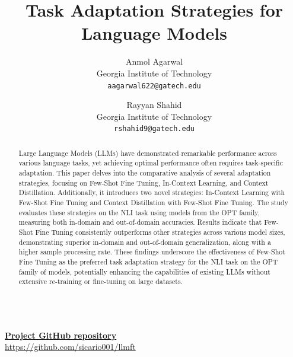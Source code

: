 \documentclass[10pt,twocolumn,letterpaper]{article}
\begin{document}
\title{Task Adaptation Strategies for Language Models}

\author{Anmol Agarwal\\
	Georgia Institute of Technology\\
	{\tt\small aagarwal622@gatech.edu}
	\and
	Rayyan Shahid\\
	Georgia Institute of Technology\\
	{\tt\small rshahid9@gatech.edu}
}

\maketitle




\begin{abstract}
	Large Language Models (LLMs) have demonstrated remarkable performance across various language tasks, yet achieving optimal performance often requires task-specific adaptation. This paper delves into the comparative analysis of several adaptation strategies, focusing on Few-Shot Fine Tuning, In-Context Learning, and Context Distillation. Additionally, it introduces two novel strategies: In-Context Learning with Few-Shot Fine Tuning and Context Distillation with Few-Shot Fine Tuning. The study evaluates these strategies on the NLI task using models from the OPT family, measuring both in-domain and out-of-domain accuracies. Results indicate that Few-Shot Fine Tuning consistently outperforms other strategies across various model sizes, demonstrating superior in-domain and out-of-domain generalization, along with a higher sample processing rate. These findings underscore the effectiveness of Few-Shot Fine Tuning as the preferred task adaptation strategy for the NLI task on the OPT family of models, potentially enhancing the capabilities of existing LLMs without extensive re-training or fine-tuning on large datasets.\\\\
\end{abstract}
\href{https://github.com/sicario001/llmft}{\textbf{Project GitHub repository}}\\
\href{https://github.com/sicario001/llmft}{https://github.com/sicario001/llmft}
\end{document}
